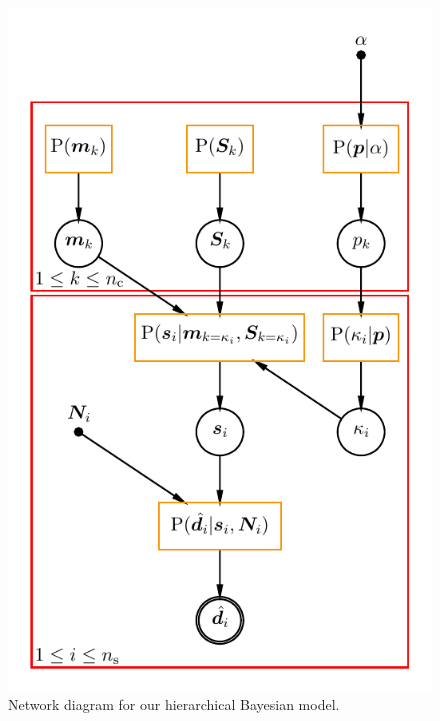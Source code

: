 \documentclass[a4paper,fleqn,usenatbib]{mnras}
\begin{document}
\begin{figure}
	\includegraphics[width=\columnwidth]{bhm_plot.pdf}
    \caption{Network diagram for our hierarchical Bayesian model.}
    \label{fig:network_diagram}
\end{figure}
\end{document}
